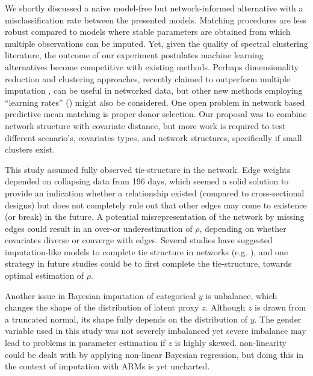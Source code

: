 \documentclass{article}
\begin{document}
We shortly discussed a naive model-free but network-informed alternative with a misclassification rate between the presented models. Matching procedures are less robust compared to models where stable parameters are obtained from which multiple observations can be imputed. Yet, given the quality of spectral clustering literature, the outcome of our experiment postulates machine learning alternatives become competitive with existing methods. Perhaps dimensionality reduction and clustering approaches, recently claimed to outperform multiple imputation \cite{hodge2019multiple}, can be useful in networked data, but other new methods employing ``learning rates'' (\cite{grunwald2017inconsistency}) might also be considered. One open problem in network based predictive mean matching is proper donor selection. Our proposal was to combine network structure with covariate distance, but more work is required to test different scenario's, covariates types, and network structures, specifically if small clusters exist.

This study assumed fully observed tie-structure in the network. Edge weights depended on collapsing data from 196 days, which seemed a solid solution to provide an indication whether a relationship existed (compared to cross-sectional designs) but does not completely rule out that other edges may come to existence (or break) in the future. A potential misrepresentation of the network by missing edges could result in an over-or underestimation of $\rho$, depending on whether covariates diverse or converge with edges. Several studies have suggested imputation-like models to complete tie structure in networks (e.g. \cite{huisman2009imputation}), and one strategy in future studies could be to first complete the tie-structure, towards optimal estimation of $\rho$.

Another issue in Bayesian imputation of categorical $y$ is unbalance, which changes the shape of the distribution of latent proxy $z$. Although $z$ is drawn from a truncated normal, its shape fully depends on the distribution of $y$. The gender variable used in this study was not severely imbalanced yet severe imbalance may lead to problems in parameter estimation if $z$ is highly skewed. non-linearity could be dealt with by applying non-linear Bayesian regression, but doing this in the context of imputation with ARMs is yet uncharted.
\end{document}
